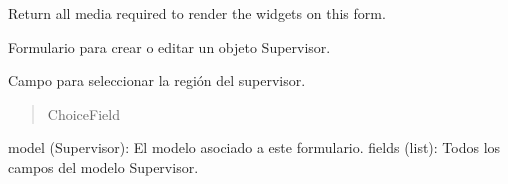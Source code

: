 \documentclass[letterpaper,10pt,spanish]{sphinxmanual}
\begin{document}
\begin{fulllineitems}
\begin{fulllineitems}

\pysigstartsignatures
{}
\pysigstopsignatures
\sphinxAtStartPar
Return all media required to render the widgets on this form.

\end{fulllineitems}


\end{fulllineitems}



\begin{fulllineitems}

\pysigstartsignatures
{}
\pysigstopsignatures
\sphinxAtStartPar
Formulario para crear o editar un objeto Supervisor.


\begin{fulllineitems}

\pysigstartsignatures
{}
\pysigstopsignatures
\sphinxAtStartPar
Campo para seleccionar la región del supervisor.
\begin{quote}\begin{description}
\sphinxAtStartPar
ChoiceField

\end{description}\end{quote}

\end{fulllineitems}

\begin{description}
\sphinxAtStartPar
model (Supervisor): El modelo asociado a este formulario.
fields (list): Todos los campos del modelo Supervisor.


\end{description}
\end{fulllineitems}
\end{document}
